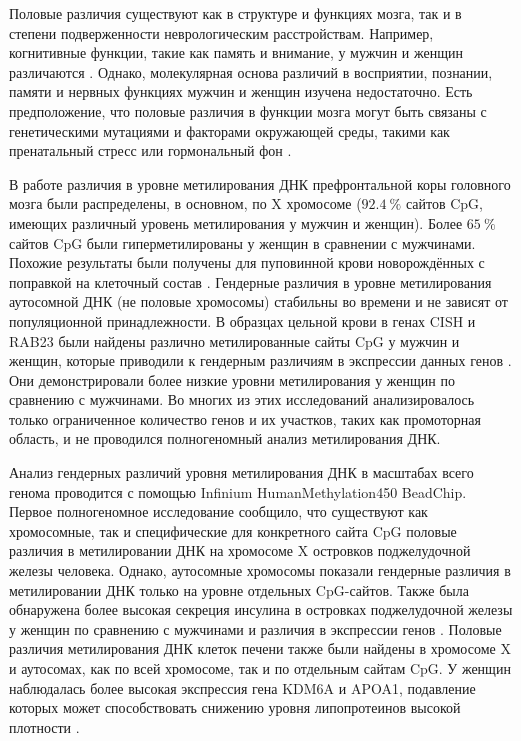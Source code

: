 Половые различия существуют как в структуре и функциях мозга, так и в степени подверженности неврологическим расстройствам. Например, когнитивные функции, такие как память и внимание, у мужчин и женщин различаются \autocite{Gur1999}. Однако, молекулярная основа различий в восприятии, познании, памяти и нервных функциях мужчин и женщин изучена недостаточно. Есть предположение, что половые различия в функции мозга могут быть связаны с генетическими мутациями \autocite{Qureshi2010} и факторами окружающей среды, такими как пренатальный стресс \autocite{Bowman2004} или гормональный фон \autocite{Lenz2010}.

В работе \autocite{Xu2013} различия в уровне метилирования ДНК префронтальной коры головного мозга были распределены, в основном, по X хромосоме ($92.4~\%$ сайтов CpG, имеющих различный уровень метилирования у мужчин и женщин). Более $65~\%$ сайтов CpG были гиперметилированы у женщин в сравнении с мужчинами. Похожие результаты были получены для пуповинной крови новорождённых с поправкой на клеточный состав \autocite{Yousefi2015}. Гендерные различия в уровне метилирования аутосомной ДНК (не половые хромосомы) стабильны во времени и не зависят от популяционной принадлежности. В образцах цельной крови в генах CISH и RAB23 были найдены различно метилированные сайты CpG у мужчин и женщин, которые приводили к гендерным различиям в экспрессии данных генов \autocite{Singmann2015}. Они демонстрировали более низкие уровни метилирования у женщин по сравнению с мужчинами. Во многих из этих исследований анализировалось только ограниченное количество генов и их участков, таких как промоторная область, и не проводился полногеномный анализ метилирования ДНК.

Анализ гендерных различий уровня метилирования ДНК в масштабах всего генома проводится с помощью Infinium HumanMethylation450 BeadChip. Первое полногеномное исследование сообщило, что существуют как хромосомные, так и специфические для конкретного сайта CpG половые различия в метилировании ДНК на хромосоме X островков поджелудочной железы человека. Однако, аутосомные хромосомы показали гендерные различия в метилировании ДНК только на уровне отдельных CpG-сайтов. Также была обнаружена более высокая секреция инсулина в островках поджелудочной железы у женщин по сравнению с мужчинами и различия в экспрессии генов \autocite{Hall2014}. Половые различия метилирования ДНК клеток печени также были найдены в хромосоме X и аутосомах, как по всей хромосоме, так и по отдельным сайтам CpG. У женщин наблюдалась более высокая экспрессия гена KDM6A и APOA1, подавление которых может способствовать снижению уровня липопротеинов высокой плотности \autocite{GarciaCalzon2018}.

